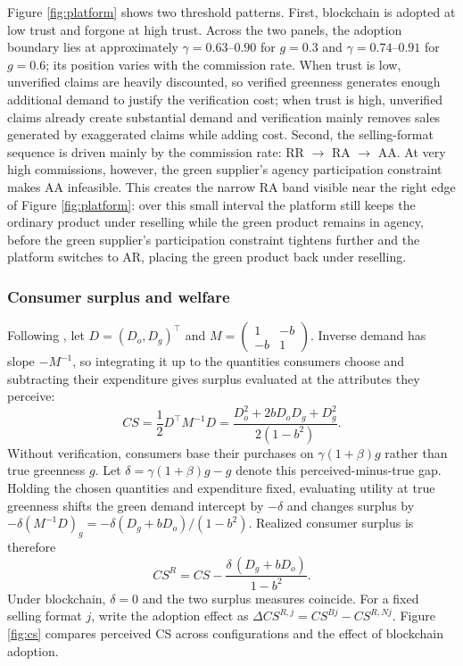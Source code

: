 \documentclass[preprint,review,12pt,authoryear,nopreprintline]{elsarticle}
\theoremstyle{definition}
\begin{document}
Figure \ref{fig:platform} shows two threshold patterns. First, blockchain is adopted at low trust and forgone at high trust. Across the two panels, the adoption boundary lies at approximately $\gamma=0.63$--$0.90$ for $g=0.3$ and $\gamma=0.74$--$0.91$ for $g=0.6$; its position varies with the commission rate. When trust is low, unverified claims are heavily discounted, so verified greenness generates enough additional demand to justify the verification cost; when trust is high, unverified claims already create substantial demand and verification mainly removes sales generated by exaggerated claims while adding cost. Second, the selling-format sequence is driven mainly by the commission rate: RR $\rightarrow$ RA $\rightarrow$ AA. At very high commissions, however, the green supplier's agency participation constraint makes AA infeasible. This creates the narrow RA band visible near the right edge of Figure \ref{fig:platform}: over this small interval the platform still keeps the ordinary product under reselling while the green product remains in agency, before the green supplier's participation constraint tightens further and the platform switches to AR, placing the green product back under reselling.

\subsubsection{Consumer surplus and welfare}

Following \citet{singh1984,liu2014ad,wu2015online}, let $D=(D_o,D_g)^\top$ and $M=\left(\begin{smallmatrix}1&-b\\-b&1\end{smallmatrix}\right)$. Inverse demand has slope $-M^{-1}$, so integrating it up to the quantities consumers choose and subtracting their expenditure gives surplus evaluated at the attributes they perceive:
\begin{equation}\label{eq:perceived-cs}
CS=\frac{1}{2}D^\top M^{-1}D
=\frac{D_o^2+2bD_oD_g+D_g^2}{2(1-b^2)}.
\end{equation}
Without verification, consumers base their purchases on $\gamma(1+\beta)g$ rather than true greenness $g$. Let $\delta=\gamma(1+\beta)g-g$ denote this perceived-minus-true gap. Holding the chosen quantities and expenditure fixed, evaluating utility at true greenness shifts the green demand intercept by $-\delta$ and changes surplus by $-\delta(M^{-1}D)_g=-\delta(D_g+bD_o)/(1-b^2)$. Realized consumer surplus is therefore
\begin{equation}\label{eq:realized-cs}
CS^{R}=CS-\frac{\delta\,(D_g+bD_o)}{1-b^2}.
\end{equation}
Under blockchain, $\delta=0$ and the two surplus measures coincide. For a fixed selling format $j$, write the adoption effect as $\Delta CS^{R,j}=CS^{Bj}-CS^{R,Nj}$. Figure \ref{fig:cs} compares perceived CS across configurations and the effect of blockchain adoption.
\end{document}
